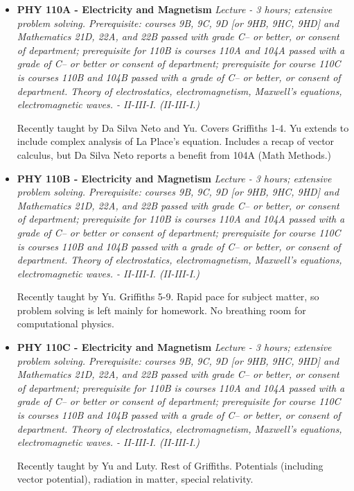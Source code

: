 \documentclass[12pt]{article}
\begin{document}
\begin{itemize}
\item {\bf PHY 110A - Electricity and Magnetism}
{\it Lecture - 3 hours; extensive problem solving. Prerequisite: courses 9B, 9C, 9D [or 9HB, 9HC, 9HD] and Mathematics 21D, 22A, and 22B passed with grade C– or better, or consent of department; prerequisite for 110B is courses 110A and 104A passed with a grade of C– or better or consent of department; prerequisite for course 110C is courses 110B and 104B passed with a grade of C– or better, or consent of department. Theory of electrostatics, electromagnetism, Maxwell’s equations, electromagnetic waves. - II-III-I. (II-III-I.)}

Recently taught by Da Silva Neto and Yu.  Covers Griffiths 1-4.  Yu extends to include complex analysis of La Place's equation.  Includes a recap of vector calculus, but Da Silva Neto reports a benefit from 104A  (Math Methods.)

\item {\bf PHY 110B - Electricity and Magnetism}
{\it Lecture - 3 hours; extensive problem solving. Prerequisite: courses 9B, 9C, 9D [or 9HB, 9HC, 9HD] and Mathematics 21D, 22A, and 22B passed with grade C– or better, or consent of department; prerequisite for 110B is courses 110A and 104A passed with a grade of C– or better or consent of department; prerequisite for course 110C is courses 110B and 104B passed with a grade of C– or better, or consent of department. Theory of electrostatics, electromagnetism, Maxwell’s equations, electromagnetic waves. - II-III-I. (II-III-I.)}

Recently taught by Yu.  Griffiths 5-9.  Rapid pace for subject matter, so problem solving is left mainly for homework.  No breathing room for computational physics.

\item {\bf PHY 110C - Electricity and Magnetism}
{\it Lecture - 3 hours; extensive problem solving. Prerequisite: courses 9B, 9C, 9D [or 9HB, 9HC, 9HD] and Mathematics 21D, 22A, and 22B passed with grade C– or better, or consent of department; prerequisite for 110B is courses 110A and 104A passed with a grade of C– or better or consent of department; prerequisite for course 110C is courses 110B and 104B passed with a grade of C– or better, or consent of department. Theory of electrostatics, electromagnetism, Maxwell’s equations, electromagnetic waves. - II-III-I. (II-III-I.)}

Recently taught by Yu and Luty.  Rest of Griffiths.   Potentials (including vector potential), radiation in matter, special relativity.


\end{itemize}
\end{document}
